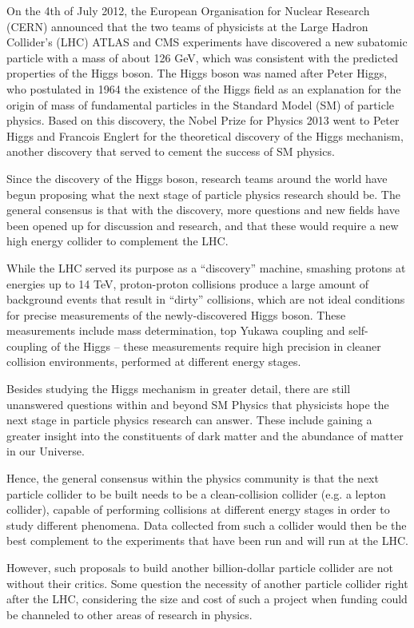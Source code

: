 On the 4th of July 2012, the European Organisation for Nuclear Research (CERN) announced that the two teams of physicists at the Large Hadron Collider’s (LHC) ATLAS and CMS experiments have discovered a new subatomic particle with a mass of about 126 GeV, which was consistent with the predicted properties of the Higgs boson. The Higgs boson was named after Peter Higgs, who postulated in 1964 the existence of the Higgs field as an explanation for the origin of mass of fundamental particles in the Standard Model (SM) of particle physics. Based on this discovery, the Nobel Prize for Physics 2013 went to Peter Higgs and Francois Englert for the theoretical discovery of the Higgs mechanism, another discovery that served to cement the success of SM physics.
 
Since the discovery of the Higgs boson, research teams around the world have begun proposing what the next stage of particle physics research should be. The general consensus is that with the discovery, more questions and new fields have been opened up for discussion and research, and that these would require a new high energy collider to complement the LHC.
 
While the LHC served its purpose as a “discovery” machine, smashing protons at energies up to 14 TeV, proton-proton collisions produce a large amount of background events that result in “dirty” collisions, which are not ideal conditions for precise measurements of the newly-discovered Higgs boson. These measurements include mass determination, top Yukawa coupling and self-coupling of the Higgs – these measurements require high precision in cleaner collision environments, performed at different energy stages.
 
Besides studying the Higgs mechanism in greater detail, there are still unanswered questions within and beyond SM Physics that physicists hope the next stage in particle physics research can answer. These include gaining a greater insight into the constituents of dark matter and the abundance of matter in our Universe.
 
Hence, the general consensus within the physics community is that the next particle collider to be built needs to be a clean-collision collider (e.g. a lepton collider), capable of performing collisions at different energy stages in order to study different phenomena. Data collected from such a collider would then be the best complement to the experiments that have been run and will run at the LHC.
 
However, such proposals to build another billion-dollar particle collider are not without their critics. Some question the necessity of another particle collider right after the LHC, considering the size and cost of such a project when funding could be channeled to other areas of research in physics.
